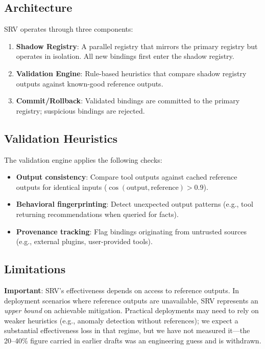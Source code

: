 \documentclass{article}
\theoremstyle{plain}
\theoremstyle{definition}
\begin{document}
\subsection{Architecture}

SRV operates through three components:
\begin{enumerate}
    \item \textbf{Shadow Registry}: A parallel registry that mirrors the primary registry but operates in isolation. All new bindings first enter the shadow registry.
    \item \textbf{Validation Engine}: Rule-based heuristics that compare shadow registry outputs against known-good reference outputs.
    \item \textbf{Commit/Rollback}: Validated bindings are committed to the primary registry; suspicious bindings are rejected.
\end{enumerate}

\subsection{Validation Heuristics}

The validation engine applies the following checks:
\begin{itemize}
    \item \textbf{Output consistency}: Compare tool outputs against cached reference outputs for identical inputs ($\cos(\text{output}, \text{reference}) > 0.9$).
    \item \textbf{Behavioral fingerprinting}: Detect unexpected output patterns (e.g., tool returning recommendations when queried for facts).
    \item \textbf{Provenance tracking}: Flag bindings originating from untrusted sources (e.g., external plugins, user-provided tools).
\end{itemize}

\subsection{Limitations}

\textbf{Important}: SRV's effectiveness depends on access to reference outputs. In deployment scenarios where reference outputs are unavailable, SRV represents an \emph{upper bound} on achievable mitigation. Practical deployments may need to rely on weaker heuristics (e.g., anomaly detection without references); we expect a substantial effectiveness loss in that regime, but we have not measured it---the 20--40\% figure carried in earlier drafts was an engineering guess and is withdrawn.
\end{document}
